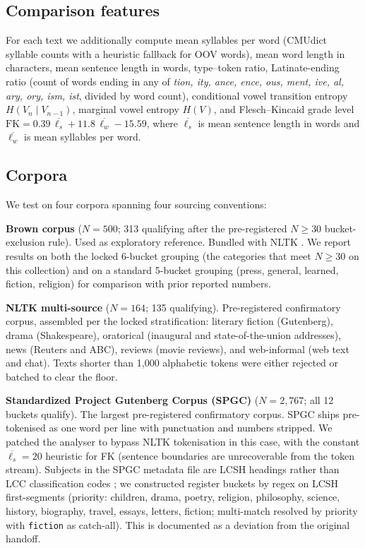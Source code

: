 \documentclass[11pt,a4paper]{article}
\begin{document}
\subsection{Comparison features}

For each text we additionally compute mean syllables per word (CMUdict
syllable counts with a heuristic fallback for OOV words), mean word
length in characters, mean sentence length in words, type--token
ratio, Latinate-ending ratio (count of words ending in any of
\textit{tion, ity, ance, ence, ous, ment, ive, al, ary, ory, ism,
ist}, divided by word count), conditional vowel transition entropy
\(H(V_n \mid V_{n-1})\), marginal vowel entropy \(H(V)\), and
Flesch--Kincaid grade level
\(\text{FK} = 0.39\,\overline{\ell_s} + 11.8\,\overline{\ell_w} - 15.59\),
where \(\overline{\ell_s}\) is mean sentence length in words and
\(\overline{\ell_w}\) is mean syllables per word.

\subsection{Corpora}

We test on four corpora spanning four sourcing conventions:

\textbf{Brown corpus} (\(N{=}500\); 313 qualifying after the
pre-registered \(N \ge 30\) bucket-exclusion rule). Used as exploratory
reference. Bundled with NLTK \citep{nltk}. We report results on both
the locked 6-bucket grouping (the categories that meet \(N \ge 30\) on
this collection) and on a standard 5-bucket grouping (press, general,
learned, fiction, religion) for comparison with prior reported numbers.

\textbf{NLTK multi-source} (\(N{=}164\); 135 qualifying). Pre-registered
confirmatory corpus, assembled per the locked stratification:
literary fiction (Gutenberg), drama (Shakespeare), oratorical
(inaugural and state-of-the-union addresses), news (Reuters and ABC),
reviews (movie reviews), and web-informal (web text and chat). Texts
shorter than 1{,}000 alphabetic tokens were either rejected or batched
to clear the floor.

\textbf{Standardized Project Gutenberg Corpus (SPGC)}
\citep{gerlach2020} (\(N{=}2{,}767\); all 12 buckets qualify). The
largest pre-registered confirmatory corpus. SPGC ships pre-tokenised
as one word per line with punctuation and numbers stripped. We patched
the analyser to bypass NLTK tokenisation in this case, with the
constant \(\overline{\ell_s}=20\) heuristic for FK (sentence boundaries
are unrecoverable from the token stream). Subjects in the SPGC
metadata file are LCSH headings rather than LCC classification codes
\citep{lcsh}; we constructed register buckets by regex on LCSH
first-segments (priority: children, drama, poetry, religion,
philosophy, science, history, biography, travel, essays, letters,
fiction; multi-match resolved by priority with \texttt{fiction} as
catch-all). This is documented as a deviation from the original handoff.
\end{document}
